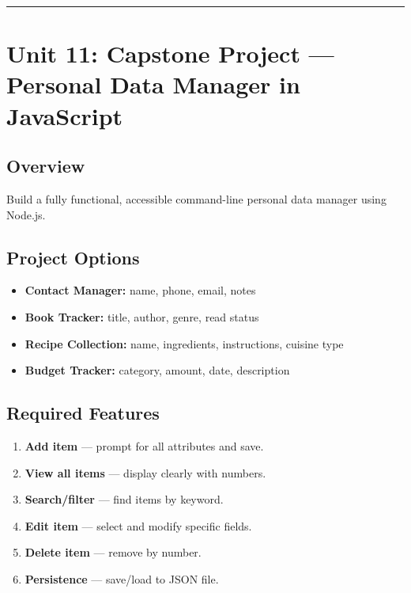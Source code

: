 \documentclass[
  justified,
  openright,
]{tufte-book}
\providecommand{\tightlist}{%
  \setlength{\itemsep}{0pt}\setlength{\parskip}{0pt}}
\begin{document}
\begin{center}\rule{0.5\linewidth}{0.5pt}\end{center}

\section{Unit 11: Capstone Project --- Personal Data Manager in
JavaScript}\label{unit-11-capstone-project-personal-data-manager-in-javascript}

\subsection{Overview}\label{overview-1}

Build a fully functional, accessible command-line personal data manager
using Node.js.

\subsection{Project Options}\label{project-options}

\begin{itemize}
\tightlist
\item
  \textbf{Contact Manager:} name, phone, email, notes
\item
  \textbf{Book Tracker:} title, author, genre, read status
\item
  \textbf{Recipe Collection:} name, ingredients, instructions, cuisine
  type
\item
  \textbf{Budget Tracker:} category, amount, date, description
\end{itemize}

\subsection{Required Features}\label{required-features}

\begin{enumerate}
\def\labelenumi{\arabic{enumi}.}
\tightlist
\item
  \textbf{Add item} --- prompt for all attributes and save.
\item
  \textbf{View all items} --- display clearly with numbers.
\item
  \textbf{Search/filter} --- find items by keyword.
\item
  \textbf{Edit item} --- select and modify specific fields.
\item
  \textbf{Delete item} --- remove by number.
\item
  \textbf{Persistence} --- save/load to JSON file.
\end{enumerate}
\end{document}
